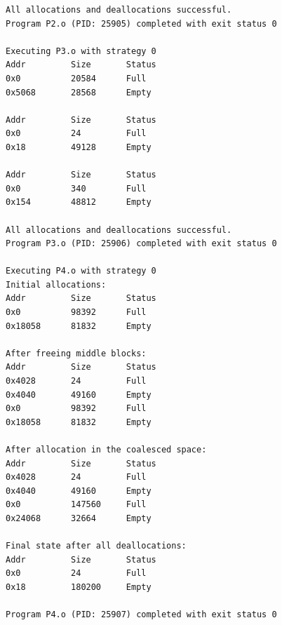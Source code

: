 \documentclass[conference]{IEEEtran}
\begin{document}
\begin{lstlisting}[label={lst:firstLst},caption={Complete Program Output}]
All allocations and deallocations successful.
Program P2.o (PID: 25905) completed with exit status 0

Executing P3.o with strategy 0
Addr         Size       Status
0x0          20584      Full
0x5068       28568      Empty

Addr         Size       Status
0x0          24         Full
0x18         49128      Empty

Addr         Size       Status
0x0          340        Full
0x154        48812      Empty

All allocations and deallocations successful.
Program P3.o (PID: 25906) completed with exit status 0

Executing P4.o with strategy 0
Initial allocations:
Addr         Size       Status
0x0          98392      Full
0x18058      81832      Empty

After freeing middle blocks:
Addr         Size       Status
0x4028       24         Full
0x4040       49160      Empty
0x0          98392      Full
0x18058      81832      Empty

After allocation in the coalesced space:
Addr         Size       Status
0x4028       24         Full
0x4040       49160      Empty
0x0          147560     Full
0x24068      32664      Empty

Final state after all deallocations:
Addr         Size       Status
0x0          24         Full
0x18         180200     Empty

Program P4.o (PID: 25907) completed with exit status 0
\end{lstlisting}




%
%
%

\end{document}
